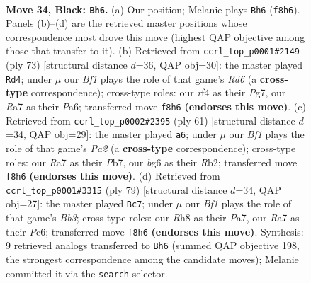 \documentclass[11pt]{article}
\begin{document}
\clearpage

\begin{figure}[p]\centering
\begin{subfigure}{0.46\textwidth}\centering
\resizebox{\linewidth}{!}{%
\newchessgame
\chessboard[
  setfen={1k3b1r/r7/p4PB1/2P4p/1P3R2/8/8/R3K3 b Q - 2 34},
  showmover=false,
  pgfstyle=straightmove, color=movearrow, markmove={f8-h6}
]}
\caption{}
\end{subfigure}\hfill
\begin{subfigure}{0.46\textwidth}\centering
\resizebox{\linewidth}{!}{%
\newchessgame
\chessboard[
  setfen={6k1/2r3p1/p3p3/2p5/2R4P/P2r2P1/1P2R1K1/8 b - - 0 37},
  showmover=false,
  pgfstyle=straightmove, color=movearrow, markmove={d3-d4}
]}
\caption{}
\end{subfigure}
\\[4pt]
\begin{subfigure}{0.46\textwidth}\centering
\resizebox{\linewidth}{!}{%
\newchessgame
\chessboard[
  setfen={2k5/pp6/2p5/P5R1/5r2/7P/1r4P1/2R3K1 b - - 0 31},
  showmover=false,
  pgfstyle=straightmove, color=movearrow, markmove={a7-a6}
]}
\caption{}
\end{subfigure}\hfill
\begin{subfigure}{0.46\textwidth}\centering
\resizebox{\linewidth}{!}{%
\newchessgame
\chessboard[
  setfen={4k3/p7/1bp1p3/8/1P3R2/r6P/5P1K/4R3 b - - 0 40},
  showmover=false,
  pgfstyle=straightmove, color=movearrow, markmove={b6-c7}
]}
\caption{}
\end{subfigure}
\caption{\textbf{Move 34, Black: \texttt{Bh6}.} (a) Our position; Melanie plays \texttt{Bh6} (\texttt{f8h6}). Panels (b)--(d) are the retrieved master positions whose correspondence most drove this move (highest QAP objective among those that transfer to it). (b) Retrieved from \texttt{ccrl\_top\_p0001\#2149} (ply 73) [structural distance $d$=36, QAP obj=30]: the master played \texttt{Rd4}; under $\mu$ our \emph{Bf1} plays the role of that game's \emph{Rd6} (a \textbf{cross-type} correspondence); cross-type roles: our \emph{r}f4 as their \emph{P}g7, our \emph{R}a7 as their \emph{P}a6; transferred move \texttt{f8h6} \textbf{(endorses this move)}. (c) Retrieved from \texttt{ccrl\_top\_p0002\#2395} (ply 61) [structural distance $d$=34, QAP obj=29]: the master played \texttt{a6}; under $\mu$ our \emph{Bf1} plays the role of that game's \emph{Pa2} (a \textbf{cross-type} correspondence); cross-type roles: our \emph{R}a7 as their \emph{P}b7, our \emph{b}g6 as their \emph{R}b2; transferred move \texttt{f8h6} \textbf{(endorses this move)}. (d) Retrieved from \texttt{ccrl\_top\_p0001\#3315} (ply 79) [structural distance $d$=34, QAP obj=27]: the master played \texttt{Bc7}; under $\mu$ our \emph{Bf1} plays the role of that game's \emph{Bb3}; cross-type roles: our \emph{R}h8 as their \emph{P}a7, our \emph{R}a7 as their \emph{P}c6; transferred move \texttt{f8h6} \textbf{(endorses this move)}. Synthesis: 9 retrieved analogs transferred to \texttt{Bh6} (summed QAP objective 198, the strongest correspondence among the candidate moves); Melanie committed it via the \texttt{search} selector.}
\label{fig:thought-m67}
\end{figure}
\end{document}
